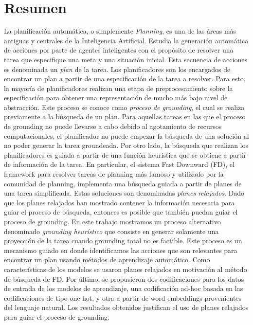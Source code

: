 \chapter*{Resumen}

La planificación automática, o simplemente \emph{Planning}, es una de las áreas
más antiguas y centrales de la Inteligencia Artificial. Estudia la generación
automática de acciones por parte de agentes inteligentes con el propósito de
resolver una tarea que especifique una meta y una situación inicial. Esta
secuencia de acciones es denominada un \emph{plan} de la tarea. Los
planificadores son los encargados de encontrar un plan a partir de una
especificación de la tarea a resolver. Para esto, la mayoría de planificadores
realizan una etapa de preprocesamiento sobre la especificación para obtener una
representación de mucho más bajo nivel de abstracción. Este proceso se conoce
como \emph{proceso de grounding}, el cual se realiza previamente a la búsqueda
de un plan. Para aquellas tareas en las que el proceso de grounding no puede
llevarse a cabo debido al agotamiento de recursos computacionales, el planificador no
puede empezar la búsqueda de una solución al no poder generar la tarea
groundeada. Por otro lado, la búsqueda que realizan los planificadores es guiada
a partir de una función heurística que se obtiene a partir de información de la
tarea. En particular, el sistema Fast Downward (FD), el framework para resolver
tareas de planning más famoso y utilizado por la comunidad de planning,
implementa una búsqueda guiada a partir de planes de una tarea simplificada.
Estas soluciones son denominadas \emph{planes relajados}. Dado que los planes
relajados han mostrado contener la información necesaria para guiar el proceso
de búsqueda, entonces es posible que también puedan guiar el proceso de
grounding. En este trabajo mostramos un proceso alternativo denominado
\emph{grounding heurístico} que consiste en generar solamente una proyección de
la tarea cuando grounding total no es factible. Este proceso es un mecanismo
guiado en donde identificamos las acciones que son relevantes para encontrar un
plan usando métodos de aprendizaje automático. Como características de los
modelos se usaron planes relajados en motivación al método de búsqueda de
FD. Por último, se propusieron dos codificaciones para los datos de entrada de
los modelos de aprendizaje, una codificación ad-hoc basada en las codificaciones
de tipo one-hot, y otra a partir de word embeddings provenientes del lenguaje
natural. Los resultados obtenidos justifican el uso de planes relajados para
guiar el proceso de grounding.


